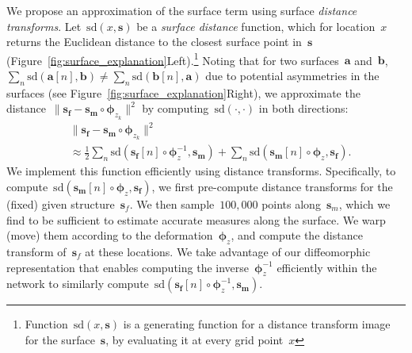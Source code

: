 \documentclass{article}
\newcommand{\bs}{\boldsymbol{s}}
\newcommand{\ba}{\boldsymbol{a}}
\newcommand{\bb}{\boldsymbol{b}}
\newcommand{\bphi}{\boldsymbol{\phi}}
\newcommand{\surfdist}{\text{sd}}
\newcommand{\bmoving}{\boldsymbol{m}}
\newcommand{\bfixed}{\boldsymbol{f}}
\begin{document}
We propose an approximation of the surface term using surface \textit{distance transforms}. Let~$\surfdist(x, \bs)$ be a \textit{surface distance} function, which for location~$x$ returns the Euclidean distance to the closest surface point in~$\bs$ (Figure~\ref{fig:surface_explanation}Left).\footnote{Function~$\surfdist(x, \bs)$ is a generating function for a distance transform image for the surface~$\bs$, by evaluating it at every grid point~$x$} Noting that for two surfaces~$\ba$ and~$\bb$, $ \sum_n \surfdist(\ba[n], \bb) \neq \sum_n \surfdist(\bb[n], \ba)$ due to potential asymmetries in the surfaces (see Figure~\ref{fig:surface_explanation}Right), we approximate the distance~$\| \bs_{\bfixed} - \bs_{\bmoving} \circ \bphi_{z_k}\|^2$ by computing~$\surfdist(\cdot, \cdot)$ in both directions: 
\begin{align}
&\| \bs_{\bfixed} - \bs_{\bmoving} \circ \bphi_{z_k}\|^2 \nonumber \\
&\approx \frac{1}{2} \sum_n \surfdist(\bs_{\bfixed}[n] \circ \bphi_z^{-1}, \bs_{\bmoving} ) + \sum_n  \surfdist(\bs_{\bmoving} [n] \circ \bphi_z, \bs_{\bfixed} ).
\label{eq:surface-approx}
\end{align}
{\color{blue} We implement this function efficiently using distance transforms. Specifically, to compute~\mbox{$\surfdist(\bs_{\bmoving} [n] \circ \bphi_z, \bs_{\bfixed})$}, we first pre-compute distance transforms for the (fixed) given structure~$\bs_f$. We then sample~$100,000$ points along~$\bs_m$, which we find to be sufficient to estimate accurate measures along the surface. We warp (move) them according to the deformation~$\bphi_z$, and compute the distance transform of~$\bs_f$ at these locations. We take advantage of our diffeomorphic representation that enables computing the inverse~$\bphi_z^{-1}$ efficiently within the network to similarly compute~\mbox{$\surfdist(\bs_{\bfixed} [n] \circ \bphi_z^{-1}, \bs_{\bmoving})$}.}
\end{document}
